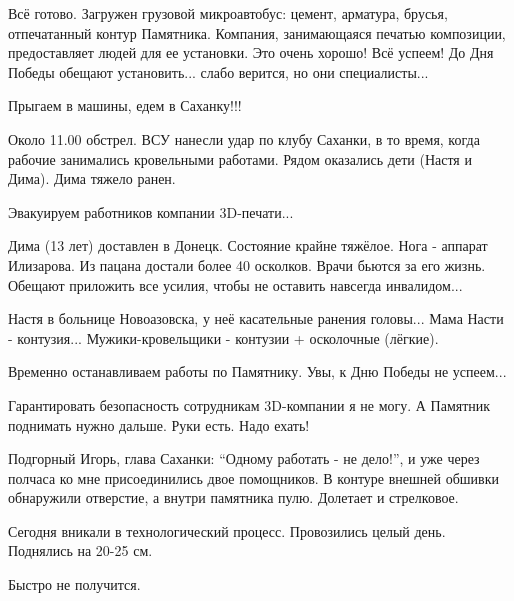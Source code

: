 \begin{multicols}{2}


Всё готово. Загружен грузовой микроавтобус: цемент, арматура, брусья,
отпечатанный контур Памятника. Компания, занимающаяся печатью композиции,
предоставляет людей для ее установки. Это очень хорошо! Всё успеем! До Дня
Победы обещают установить... слабо верится, но они специалисты...

Прыгаем в машины, едем в Саханку!!!



Около 11.00 обстрел. ВСУ нанесли удар по клубу Саханки, в то время, когда
рабочие занимались кровельными работами. Рядом оказались дети (Настя и Дима).
Дима тяжело ранен.

Эвакуируем работников компании 3D-печати...



Дима (13 лет) доставлен в Донецк. Состояние крайне тяжёлое. Нога - аппарат
Илизарова. Из пацана достали более 40 осколков. Врачи бьются за его жизнь.
Обещают приложить все усилия, чтобы не оставить навсегда инвалидом...

Настя в больнице Новоазовска, у неё касательные ранения головы... Мама Насти -
контузия... Мужики-кровельщики - контузии + осколочные (лёгкие).

Временно останавливаем работы по Памятнику. Увы, к Дню Победы не успеем...



Гарантировать безопасность сотрудникам 3D-компании я не могу. А Памятник
поднимать нужно дальше. Руки есть. Надо ехать!

Подгорный Игорь, глава Саханки: \enquote{Одному работать - не дело!}, и уже через
полчаса ко мне присоединились двое помощников. В контуре внешней обшивки
обнаружили отверстие, а внутри памятника пулю. Долетает и стрелковое.

Сегодня вникали в технологический процесс. Провозились целый день. Поднялись на
20-25 см.

Быстро не получится.


\end{multicols} %
